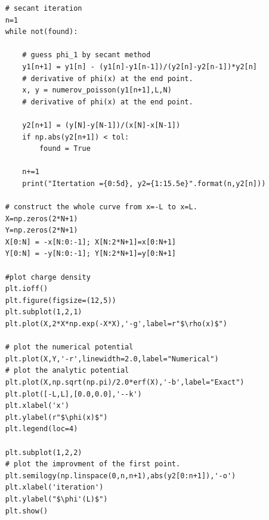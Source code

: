 \begin{verbatim}
    # secant iteration
    n=1
    while not(found):

        # guess phi_1 by secant method
        y1[n+1] = y1[n] - (y1[n]-y1[n-1])/(y2[n]-y2[n-1])*y2[n]
        # derivative of phi(x) at the end point.
        x, y = numerov_poisson(y1[n+1],L,N)
        # derivative of phi(x) at the end point.

        y2[n+1] = (y[N]-y[N-1])/(x[N]-x[N-1])
        if np.abs(y2[n+1]) < tol:
            found = True

        n+=1
        print("Itertation ={0:5d}, y2={1:15.5e}".format(n,y2[n]))

    # construct the whole curve from x=-L to x=L.
    X=np.zeros(2*N+1)
    Y=np.zeros(2*N+1)
    X[0:N] = -x[N:0:-1]; X[N:2*N+1]=x[0:N+1]
    Y[0:N] = -y[N:0:-1]; Y[N:2*N+1]=y[0:N+1]

    #plot charge density
    plt.ioff()
    plt.figure(figsize=(12,5))
    plt.subplot(1,2,1)
    plt.plot(X,2*X*np.exp(-X*X),'-g',label=r"$\rho(x)$")

    # plot the numerical potential
    plt.plot(X,Y,'-r',linewidth=2.0,label="Numerical")
    # plot the analytic potential
    plt.plot(X,np.sqrt(np.pi)/2.0*erf(X),'-b',label="Exact")
    plt.plot([-L,L],[0.0,0.0],'--k')
    plt.xlabel('x')
    plt.ylabel(r"$\phi(x)$")
    plt.legend(loc=4)

    plt.subplot(1,2,2)
    # plot the improvment of the first point.
    plt.semilogy(np.linspace(0,n,n+1),abs(y2[0:n+1]),'-o')
    plt.xlabel('iteration')
    plt.ylabel("$\phi'(L)$")
    plt.show()
\end{verbatim}
\normalsize
\bigskip
\noindent
\program
\footnotesize
